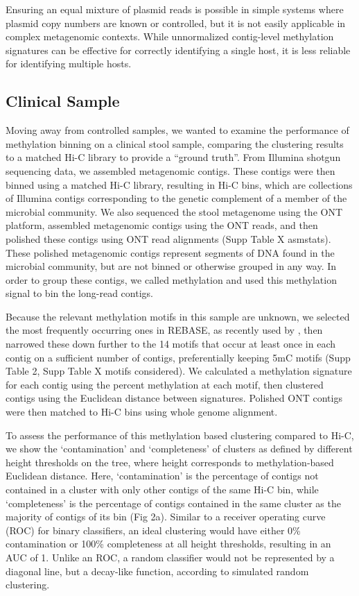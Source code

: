 Ensuring an equal mixture of plasmid reads is possible in simple systems where plasmid copy numbers are known or controlled, but it is not easily applicable in complex metagenomic contexts. While unnormalized contig-level methylation signatures can be effective for correctly identifying a single host, it is less reliable for identifying multiple hosts.


\subsection{Clinical Sample}
\label{sec:mdr}

Moving away from controlled samples, we wanted to examine the performance of methylation binning on a clinical stool sample, comparing the clustering results to a matched Hi-C library to provide a “ground truth”. From Illumina shotgun sequencing data, we assembled metagenomic contigs. These contigs were then binned using a matched Hi-C library, resulting in Hi-C bins, which are collections of Illumina contigs corresponding to the genetic complement of a member of the microbial community. We also sequenced the stool metagenome using the ONT platform, assembled metagenomic contigs using the ONT reads, and then polished these contigs using ONT read alignments (Supp Table X asmstats). These polished metagenomic contigs represent segments of DNA found in the microbial community, but are not binned or otherwise grouped in any way. In order to group these contigs, we called methylation and used this methylation signal to bin the long-read contigs.

Because the relevant methylation motifs in this sample are unknown, we selected the most frequently occurring ones in REBASE, as recently used by \citep{Tourancheau2021-hv}, then narrowed these down further to the 14 motifs that occur at least once in each contig on a sufficient number of contigs, preferentially keeping 5mC motifs  (Supp Table 2, Supp Table X motifs considered). We calculated a methylation signature for each contig using the percent methylation at each motif, then clustered contigs using the Euclidean distance between signatures. Polished ONT contigs were then matched to Hi-C bins using whole genome alignment.

To assess the performance of this methylation based clustering compared to Hi-C, we show the ‘contamination’ and ‘completeness’ of clusters as defined by different height thresholds on the tree, where height corresponds to methylation-based Euclidean distance. Here, ‘contamination’ is the percentage of contigs not contained in a cluster with only other contigs of the same Hi-C bin, while ‘completeness’ is the percentage of contigs contained in the same cluster as the majority of contigs of its bin (Fig 2a). Similar to a receiver operating curve (ROC) for binary classifiers, an ideal clustering would have either 0\% contamination or 100\% completeness at all height thresholds, resulting in an AUC of 1. Unlike an ROC, a random classifier would not be represented by a diagonal line, but a decay-like function, according to simulated random clustering.


